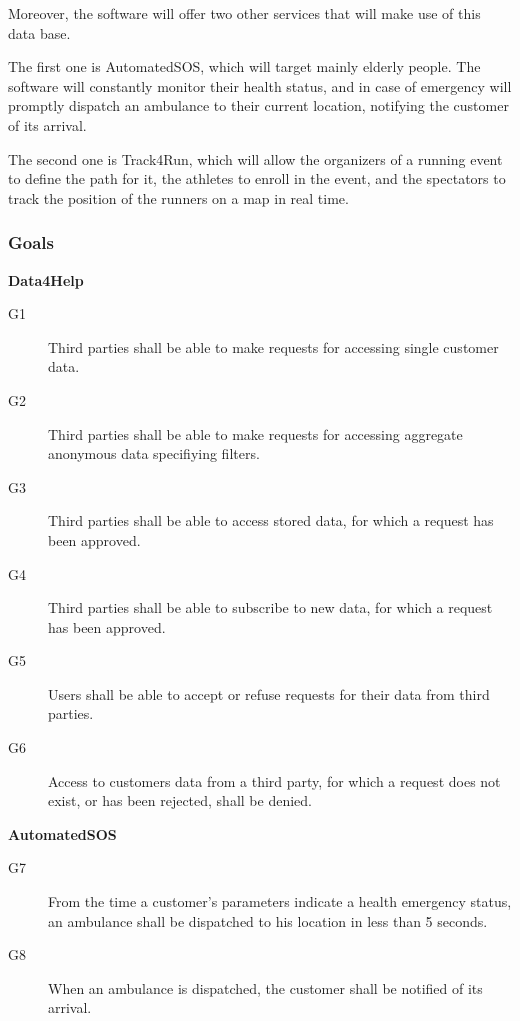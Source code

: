 \documentclass[../main.tex]{subfiles}
\begin{document}
Moreover, the software will offer two other services that will make use of this data base.

The first one is AutomatedSOS, which will target mainly elderly people. The software will constantly monitor their health status, and in case of emergency will promptly dispatch an ambulance to their current location, notifying the customer of its arrival.

The second one is Track4Run, which will allow the organizers of a running event to define the path for it, the athletes to enroll in the event, and the spectators to track the position of the runners on a map in real time.

\subsubsection{Goals}

\begin{minipage}{\textwidth}
{\bf Data4Help}
\begin{description}
	\item [G1]  Third parties shall be able to make requests for accessing single customer data.
	\item [G2]  Third parties shall be able to make requests for accessing aggregate anonymous data specifiying filters.
	\item [G3]  Third parties shall be able to access stored data, for which a request has been approved.
	\item [G4]  Third parties shall be able to subscribe to new data, for which a request has been approved.
	\item [G5]  Users shall be able to accept or refuse requests for their data from third parties.
	\item [G6]  Access to customers data from a third party, for which a request does not exist, or has been rejected, shall be denied.
\end{description}
\end{minipage}
\vspace{8mm}

\begin{minipage}{\textwidth}
{\bf AutomatedSOS}
\begin{description}
	\item [G7]  From the time a customer's parameters indicate a health emergency status, an ambulance shall be dispatched to his location in less than 5 seconds.
	\item [G8]  When an ambulance is dispatched, the customer shall be notified of its arrival.
\end{description}
\end{minipage}
\vspace{8mm}
\end{document}
